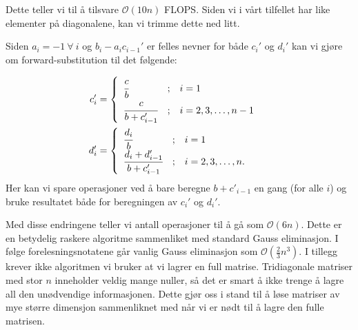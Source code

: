 \documentclass[11pt]{article}
\begin{document}
Dette teller vi til å tilsvare $\mathcal{O}(10n)$ FLOPS. Siden vi i
vårt tilfellet har like elementer på diagonalene, kan vi trimme dette
ned litt. 

Siden $a_i = -1\ \forall\  i$ og  $b_i - a_ic_{i-1}'$ er felles nevner
for både $c_i'$ og $d_i'$ kan vi gjøre om forward-substitution til det følgende:

\begin{align*}
  c_i' &= \begin{cases}
\begin{array}{lcl}
  \cfrac{c}{b}                  & ; & i = 1 \\
  \cfrac{c}{b + c'_{i - 1}} & ; & i = 2, 3, \dots, n-1 \\
\end{array}
\end{cases}\\
d_i' &= \begin{cases}
\begin{array}{lcl}
  \cfrac{d_i}{b}                  & ; & i = 1 \\
  \cfrac{d_i + d'_{i - 1}}{b + c'_{i - 1}} & ; & i = 2, 3, \dots, n. \\
\end{array}
\end{cases}
\end{align*}
Her kan vi spare operasjoner ved å bare beregne $b+c'_{i-1}$ en gang
(for alle $i$) og bruke resultatet både for beregningen av $c_{i}'$ og
$d_{i}'$.

Med disse endringene teller vi antall operasjoner til å gå som
$\mathcal{O}(6n)$. Dette er en betydelig raskere algoritme sammenliket
med standard Gauss eliminasjon. I følge forelesningsnotatene går
vanlig Gauss eliminasjon som $\mathcal{O}(\frac{ 2 }{ 3 }n^3)$. I
tillegg krever ikke algoritmen vi bruker at vi lagrer en full
matrise. Tridiagonale matriser med stor $n$ inneholder veldig mange
nuller, så det er smart å ikke trenge å lagre all den unødvendige
informasjonen. Dette gjør oss i stand til å løse matriser av mye
større dimensjon sammenliknet med når vi er nødt til å lagre den fulle matrisen.
\end{document}
